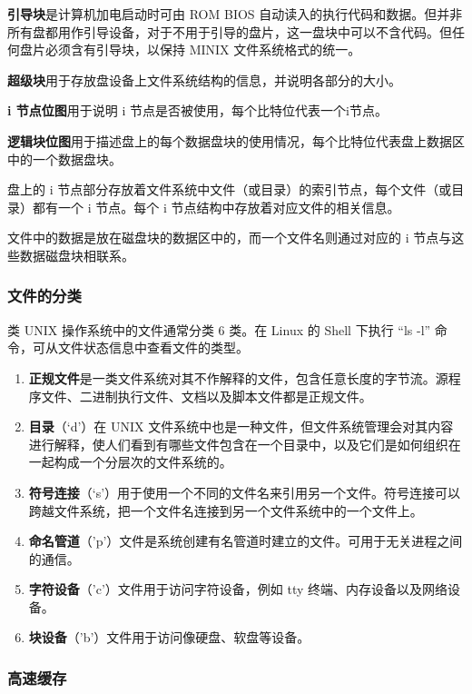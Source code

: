 \textbf{引导块}是计算机加电启动时可由 ROM BIOS 自动读入的执行代码和数据。但并非所有盘都用作引导设备，对于不用于引导的盘片，这一盘块中可以不含代码。但任何盘片必须含有引导块，以保持 MINIX 文件系统格式的统一。

\textbf{超级块}用于存放盘设备上文件系统结构的信息，并说明各部分的大小。

\textbf{i 节点位图}用于说明 i 节点是否被使用，每个比特位代表一个i节点。

\textbf{逻辑块位图}用于描述盘上的每个数据盘块的使用情况，每个比特位代表盘上数据区中的一个数据盘块。

盘上的 i 节点部分存放着文件系统中文件（或目录）的索引节点，每个文件（或目录）都有一个 i 节点。每个 i 节点结构中存放着对应文件的相关信息。

文件中的数据是放在磁盘块的数据区中的，而一个文件名则通过对应的 i 节点与这些数据磁盘块相联系。

\subsubsection{文件的分类}

类 UNIX 操作系统中的文件通常分类 6 类。在 Linux 的 Shell 下执行 “ls -l” 命令，可从文件状态信息中查看文件的类型。

\begin{enumerate}
    \item \textbf{正规文件}是一类文件系统对其不作解释的文件，包含任意长度的字节流。源程序文件、二进制执行文件、文档以及脚本文件都是正规文件。
    \item \textbf{目录}（‘d’）在 UNIX 文件系统中也是一种文件，但文件系统管理会对其内容进行解释，使人们看到有哪些文件包含在一个目录中，以及它们是如何组织在一起构成一个分层次的文件系统的。
    \item \textbf{符号连接}（‘s’）用于使用一个不同的文件名来引用另一个文件。符号连接可以跨越文件系统，把一个文件名连接到另一个文件系统中的一个文件上。
    \item \textbf{命名管道}（’p’）文件是系统创建有名管道时建立的文件。可用于无关进程之间的通信。
    \item \textbf{字符设备}（’c’）文件用于访问字符设备，例如 tty 终端、内存设备以及网络设备。
    \item \textbf{块设备}（’b’）文件用于访问像硬盘、软盘等设备。
\end{enumerate}

\subsubsection{高速缓存}

